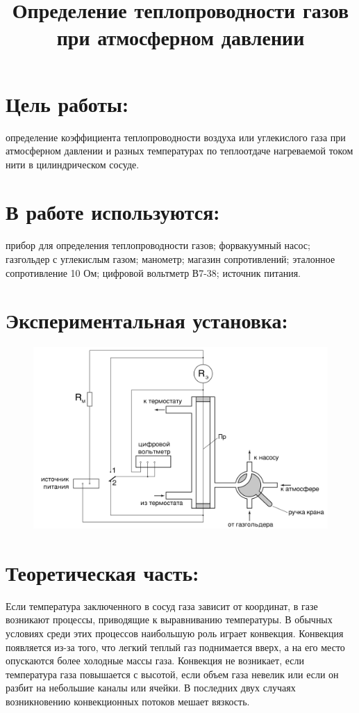 \documentclass[20pt]{article}
\author{}
\title{Определение теплопроводности газов при атмосферном давлении}
\date{}
\begin{document}
\parindent=1cm
\large
\maketitle
\section{Цель работы:}
определение коэффициента теплопроводности воздуха или углекислого газа при атмосферном давлении и разных температурах по теплоотдаче нагреваемой током нити в цилиндрическом сосуде.
\section{В работе используются:}
прибор для определения теплопроводности газов; форвакуумный насос; газгольдер с углекислым газом; манометр; магазин сопротивлений; эталонное сопротивление 10 Ом; цифровой вольтметр В7-38; источник питания.
\section{Экспериментальная установка:}
\begin{figure}[H]
	\centering
	\includegraphics[scale=0.25]{asd.png}
\end{figure}
\section{Теоретическая часть:}
Если температура заключенного в сосуд газа зависит от координат, в газе возникают процессы, приводящие к выравниванию температуры. В обычных условиях среди этих процессов наибольшую роль играет конвекция. Конвекция появляется из-за того, что легкий
теплый газ поднимается вверх, а на его место опускаются более холодные массы газа. Конвекция не возникает, если температура газа
повышается с высотой, если объем газа невелик или если он разбит на небольшие каналы или ячейки. В последних двух случаях возникновению конвекционных потоков мешает вязкость.
\end{document}
